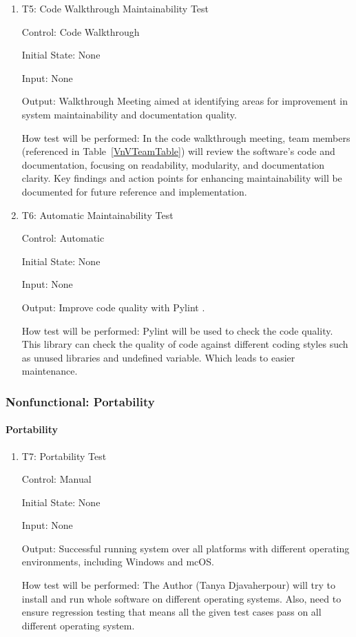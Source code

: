 \documentclass[12pt, titlepage]{article}
\begin{document}
\begin{enumerate}

  \item{T5: Code Walkthrough Maintainability Test\\}

  Control: Code Walkthrough
  
  Initial State: None
  
  Input: None
  
  Output: Walkthrough Meeting aimed at identifying areas for improvement in 
  system maintainability and documentation quality.

  How test will be performed: In the code walkthrough meeting, team members 
  (referenced in Table~\ref{VnVTeamTable}) will review the software's code and documentation, 
  focusing on readability, modularity, and documentation clarity. Key findings and action 
  points for enhancing maintainability will be documented for future reference and implementation.

  \item{T6: Automatic Maintainability Test\\}

  Control: Automatic
  
  Initial State: None
  
  Input: None
  
  Output: Improve code quality with Pylint \cite{pylint}.

  How test will be performed: Pylint \cite{pylint} will be used to check the code quality.
  This library can check the quality of code against different coding styles such as unused libraries
  and undefined variable. Which leads to easier maintenance.
\end{enumerate}

\subsubsection{Nonfunctional: Portability} \label{NFPortablity}
		
\paragraph{Portability}

\begin{enumerate}

  \item{T7: Portability Test\\}

  Control: Manual
  
  Initial State: None
  
  Input: None
  
  Output: Successful running system over all platforms with different operating environments, 
  including Windows and mcOS.

  How test will be performed: The Author (Tanya Djavaherpour) will try to install and run
  whole software on different operating systems. Also, need to ensure regression testing
  that means all the given test cases pass on all different operating system.
\end{enumerate}
\end{document}

